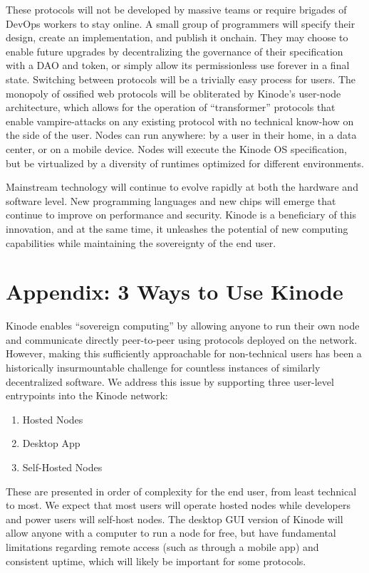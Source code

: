 \documentclass[runningheads]{llncs}
\begin{document}
These protocols will not be developed by massive teams or require brigades of DevOps workers to stay online.
A small group of programmers will specify their design, create an implementation, and publish it onchain.
They may choose to enable future upgrades by decentralizing the governance of their specification with a DAO and token, or simply allow its permissionless use forever in a final state.
Switching between protocols will be a trivially easy process for users.
The monopoly of ossified web protocols will be obliterated by Kinode's user-node architecture, which allows for the operation of ``transformer'' protocols that enable vampire-attacks on any existing protocol with no technical know-how on the side of the user.
Nodes can run anywhere: by a user in their home, in a data center, or on a mobile device.
Nodes will execute the Kinode OS specification, but be virtualized by a diversity of runtimes optimized for different environments.

Mainstream technology will continue to evolve rapidly at both the hardware and software level. New programming languages and new chips will emerge that continue to improve on performance and security.
Kinode is a beneficiary of this innovation, and at the same time, it unleashes the potential of new computing capabilities while maintaining the sovereignty of the end user.


\newpage
\section{Appendix: 3 Ways to Use Kinode}

Kinode enables ``sovereign computing'' by allowing anyone to run their own node and communicate directly peer-to-peer using protocols deployed on the network.
However, making this sufficiently approachable for non-technical users has been a historically insurmountable challenge for countless instances of similarly decentralized software.
We address this issue by supporting three user-level entrypoints into the Kinode network:
\begin{enumerate}
    \item Hosted Nodes
    \item Desktop App
    \item Self-Hosted Nodes
\end{enumerate}

These are presented in order of complexity for the end user, from least technical to most.
We expect that most users will operate hosted nodes while developers and power users will self-host nodes.
The desktop GUI version of Kinode will allow anyone with a computer to run a node for free, but have fundamental limitations regarding remote access (such as through a mobile app) and consistent uptime, which will likely be important for some protocols.
\end{document}
